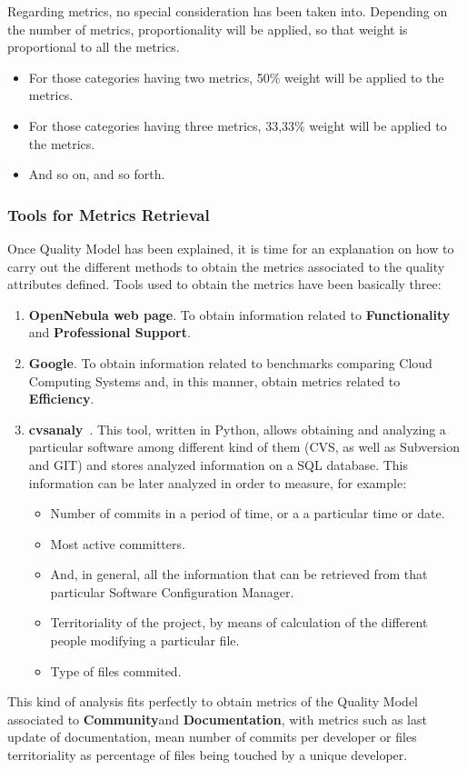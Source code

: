\documentclass[11pt]{article}
\begin{document}
Regarding metrics, no special consideration has been taken into. Depending on the number of metrics, proportionality will be applied, so that weight is proportional to all the metrics. 
\begin{itemize}\itemsep0pt
\item{For those categories having two metrics, 50\% weight will be applied to the metrics.}
\item{For those categories having three metrics, 33,33\% weight will be applied to the metrics.}
\item{And so on, and so forth.}
\end{itemize}

\subsubsection{Tools for Metrics Retrieval}

Once Quality Model has been explained, it is time for an explanation on how to carry out the different methods to obtain the metrics associated to the quality attributes defined. Tools used to obtain the metrics have been basically three:
\begin{enumerate}\itemsep0pt
\item{\textbf{OpenNebula web page}}. To obtain information related to \textbf{Functionality} and \textbf{Professional Support}.
\item{\textbf{Google}}. To obtain information related to benchmarks comparing Cloud Computing Systems and, in this manner, obtain metrics related to \textbf{Efficiency}.
\item{\textbf{cvsanaly}}~\cite{CVSANALY00}. This tool, written in Python, allows obtaining and analyzing a particular software among different kind of them (CVS, as well as Subversion and GIT) and stores analyzed information on a SQL database. This information can be later analyzed in order to measure, for example:
\begin{itemize}\itemsep0pt
\item{Number of commits in a period of time, or a a particular time or date}.
\item{Most active committers}.
\item{And, in general, all the information that can be retrieved from that particular Software Configuration Manager}.
\item{Territoriality of the project, by means of calculation of the different people modifying a particular file}.
\item{Type of files commited}.
\end{itemize}
\end{enumerate}
This kind of analysis fits perfectly to obtain metrics of the Quality Model associated to \textbf{Community}and \textbf{Documentation}, with metrics such as last update of documentation, mean number of commits per developer or files territoriality as percentage of files being touched by a unique developer.
\end{document}
